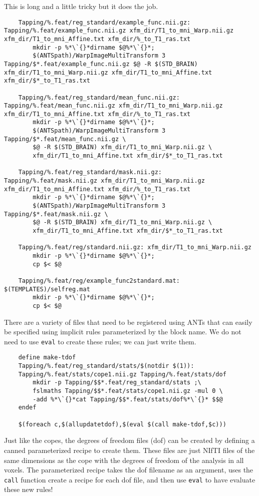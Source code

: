 This is long and a little tricky but it does the job.

\begin{lstlisting}
	Tapping/%.feat/reg_standard/example_func.nii.gz: Tapping/%.feat/example_func.nii.gz xfm_dir/T1_to_mni_Warp.nii.gz xfm_dir/T1_to_mni_Affine.txt xfm_dir/%_to_T1_ras.txt
		mkdir -p %*\`{}*dirname $@%*\`{}*;
		$(ANTSpath)/WarpImageMultiTransform 3 Tapping/$*.feat/example_func.nii.gz $@ -R $(STD_BRAIN) xfm_dir/T1_to_mni_Warp.nii.gz xfm_dir/T1_to_mni_Affine.txt xfm_dir/$*_to_T1_ras.txt

	Tapping/%.feat/reg_standard/mean_func.nii.gz: Tapping/%.feat/mean_func.nii.gz xfm_dir/T1_to_mni_Warp.nii.gz xfm_dir/T1_to_mni_Affine.txt xfm_dir/%_to_T1_ras.txt
		mkdir -p %*\`{}*dirname $@%*\`{}*;
		$(ANTSpath)/WarpImageMultiTransform 3 Tapping/$*.feat/mean_func.nii.gz \
		$@ -R $(STD_BRAIN) xfm_dir/T1_to_mni_Warp.nii.gz \
		xfm_dir/T1_to_mni_Affine.txt xfm_dir/$*_to_T1_ras.txt

	Tapping/%.feat/reg_standard/mask.nii.gz: Tapping/%.feat/mask.nii.gz xfm_dir/T1_to_mni_Warp.nii.gz xfm_dir/T1_to_mni_Affine.txt xfm_dir/%_to_T1_ras.txt
		mkdir -p %*\`{}*dirname $@%*\`{}*;
		$(ANTSpath)/WarpImageMultiTransform 3 Tapping/$*.feat/mask.nii.gz \
		$@ -R $(STD_BRAIN) xfm_dir/T1_to_mni_Warp.nii.gz \
		xfm_dir/T1_to_mni_Affine.txt xfm_dir/$*_to_T1_ras.txt

	Tapping/%.feat/reg/standard.nii.gz: xfm_dir/T1_to_mni_Warp.nii.gz
		mkdir -p %*\`{}*dirname $@%*\`{}*;
		cp $< $@

	Tapping/%.feat/reg/example_func2standard.mat: $(TEMPLATES)/selfreg.mat
		mkdir -p %*\`{}*dirname $@%*\`{}*;
		cp $< $@
\end{lstlisting}
There are a variety of files that need to be registered using ANTs
that can easily be specified using implicit rules parameterized by the
block name. We do not need to use \texttt{eval} to create these rules;
we can just write them. 

\begin{lstlisting}
	define make-tdof 
	Tapping/%.feat/reg_standard/stats/$(notdir $(1)): 
	Tapping/%.feat/stats/cope1.nii.gz Tapping/%.feat/stats/dof 
		mkdir -p Tapping/$$*.feat/reg_standard/stats ;\
		fslmaths Tapping/$$*.feat/stats/cope1.nii.gz -mul 0 \
		-add %*\`{}*cat Tapping/$$*.feat/stats/dof%*\`{}* $$@
	endef 

	$(foreach c,$(allupdatetdof),$(eval $(call make-tdof,$c))) 
\end{lstlisting}
Just like the copes, the degrees of freedom files (dof) can be 
created by defining a canned parameterized recipe to create 
them. These files are just NIfTI files of the same dimensions as the 
cope with the degrees of freedom of the analysis in all voxels.  The 
parameterized recipe takes the dof filename as an argument, uses the \texttt{call}
function create a \maken{} recipe for each dof file, and then use 
\texttt{eval} to have \maken{} evaluate these new rules!

